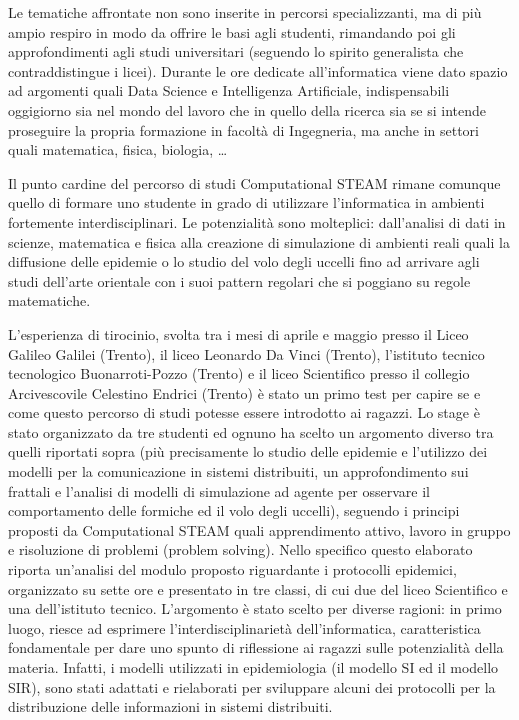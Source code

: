 Le tematiche affrontate non sono inserite in percorsi specializzanti, ma di più ampio respiro in modo da offrire le basi agli studenti, rimandando poi gli approfondimenti agli studi universitari (seguendo lo spirito generalista che contraddistingue i licei). Durante le ore dedicate all'informatica viene dato spazio ad argomenti quali Data Science e Intelligenza Artificiale, indispensabili oggigiorno sia nel mondo del lavoro che in quello della ricerca sia se si intende proseguire la propria formazione in facoltà di Ingegneria, ma anche in settori quali matematica, fisica, biologia, \dots

Il punto cardine del percorso di studi Computational STEAM rimane comunque quello di formare uno studente in grado di utilizzare l'informatica in ambienti fortemente interdisciplinari. Le potenzialità sono molteplici: dall'analisi di dati in scienze, matematica e fisica alla creazione di simulazione di ambienti reali quali la diffusione delle epidemie o lo studio del volo degli uccelli fino ad arrivare agli studi dell'arte orientale con i suoi pattern regolari che si poggiano su regole matematiche.

L'esperienza di tirocinio, svolta tra i mesi di aprile e maggio presso il Liceo Galileo Galilei (Trento), il liceo Leonardo Da Vinci (Trento), l’istituto tecnico tecnologico Buonarroti-Pozzo (Trento) e il liceo Scientifico presso il collegio Arcivescovile Celestino Endrici (Trento) è stato un primo test per capire se e come questo percorso di studi potesse essere introdotto ai ragazzi. 
Lo stage è stato organizzato da tre studenti ed ognuno ha scelto un argomento diverso tra quelli riportati sopra (più precisamente lo studio delle epidemie e l'utilizzo dei modelli per la comunicazione in sistemi distribuiti, un approfondimento sui frattali e l'analisi di modelli di simulazione ad agente per osservare il comportamento delle formiche ed il volo degli uccelli), seguendo i principi proposti da Computational STEAM quali apprendimento attivo, lavoro in gruppo e risoluzione di problemi (problem solving). Nello specifico questo elaborato riporta un'analisi del modulo proposto riguardante i protocolli epidemici, organizzato su sette ore e presentato in tre classi, di cui due del liceo Scientifico e una dell'istituto tecnico. L'argomento è stato scelto per diverse ragioni: in primo luogo, riesce ad esprimere l'interdisciplinarietà dell'informatica, caratteristica fondamentale per dare uno spunto di riflessione ai ragazzi sulle potenzialità della materia. Infatti, i modelli utilizzati in epidemiologia (il modello SI ed il modello SIR), sono stati adattati e rielaborati per sviluppare alcuni dei protocolli per la distribuzione delle informazioni in sistemi distribuiti.

